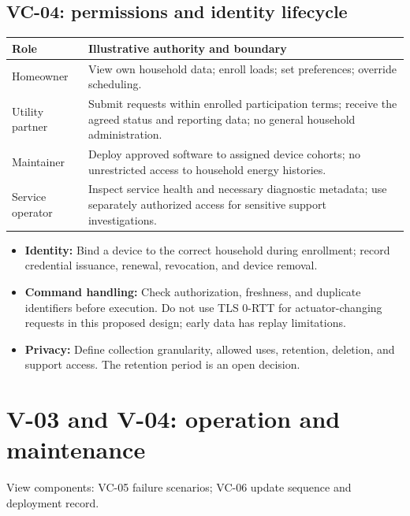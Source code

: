 \documentclass[11pt,letterpaper]{article}
\newcommand{\tablehead}[1]{\sffamily\bfseries\color{Navy}#1}
\newcommand{\pageintro}[1]{{\color{Muted}#1}\par\vspace{3pt}}
\begin{document}
\subsection{VC-04: permissions and identity lifecycle}
{\small
\begin{tabularx}{\linewidth}{@{}L{1.12in}Y@{}}
\toprule
\tablehead{Role} & \tablehead{Illustrative authority and boundary}\\
\midrule
Homeowner & View own household data; enroll loads; set preferences; override scheduling.\\
Utility partner & Submit requests within enrolled participation terms; receive the
agreed status and reporting data; no general household administration.\\
Maintainer & Deploy approved software to assigned device cohorts; no unrestricted
access to household energy histories.\\
Service operator & Inspect service health and necessary diagnostic metadata;
use separately authorized access for sensitive support investigations.\\
\bottomrule
\end{tabularx}}

\begin{itemize}
\item \textbf{Identity:} Bind a device to the correct household during enrollment;
record credential issuance, renewal, revocation, and device removal.
\item \textbf{Command handling:} Check authorization, freshness, and duplicate
identifiers before execution. Do not use TLS 0-RTT for actuator-changing requests
in this proposed design; early data has replay limitations.~\cite{tls13}
\item \textbf{Privacy:} Define collection granularity, allowed uses, retention,
deletion, and support access. The retention period is an open decision.
\end{itemize}

\newpage
\section{V-03 and V-04: operation and maintenance}
\pageintro{View components: VC-05 failure scenarios; VC-06 update sequence and deployment record.}
\end{document}
